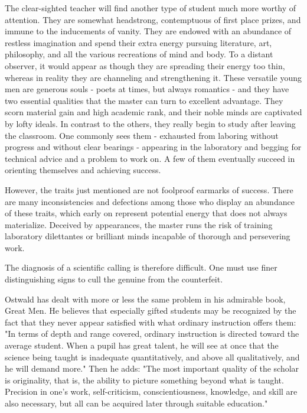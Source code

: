\documentclass{article}
\begin{document}
The clear-sighted teacher will find another type of student much more worthy of attention. They are somewhat headstrong, contemptuous of first place prizes, and immune to the inducements of vanity. They are endowed with an abundance of restless imagination and spend their extra energy pursuing literature, art, philosophy, and all the various recreations of mind and body. To a distant observer, it would appear as though they are spreading their energy too thin, whereas in reality they are channeling and strengthening it. These versatile young men are generous souls - poets at times, but always romantics - and they have two essential qualities that the master can turn to excellent advantage. They scorn material gain and high academic rank, and their noble minds are captivated by lofty ideals. In contrast to the others, they really begin to study after leaving the classroom. One commonly sees them - exhausted from laboring without progress and without clear bearings - appearing in the laboratory and begging for technical advice and a problem to work on. A few of them eventually succeed in orienting themselves and achieving success.

However, the traits just mentioned are not foolproof earmarks of success. There are many inconsistencies and defections among those who display an abundance of these traits, which early on represent potential energy that does not always materialize. Deceived by appearances, the master runs the risk of training laboratory dilettantes or brilliant minds incapable of thorough and persevering work.

The diagnosis of a scientific calling is therefore difficult. One must use finer distinguishing signs to cull the genuine from the counterfeit.

Ostwald has dealt with more or less the same problem in his admirable book, Great Men. He believes that especially gifted students may be recognized by the fact that they never appear satisfied with what ordinary instruction offers them: "In terms of depth and range covered, ordinary instruction is directed toward the average student. When a pupil has great talent, he will see at once that the science being taught is inadequate quantitatively, and above all qualitatively, and he will demand more." Then he adds: "The most important quality of the scholar is originality, that is, the ability to picture something beyond what is taught. Precision in one’s work, self-criticism, conscientiousness, knowledge, and skill are also necessary, but all can be acquired later through suitable education."
\end{document}
